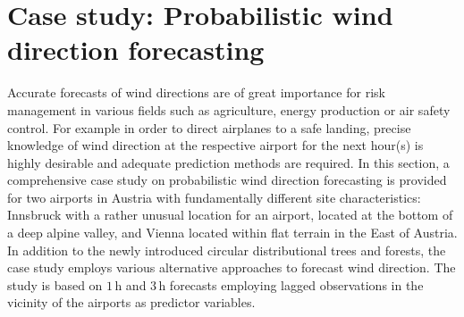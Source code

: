 \documentclass[nojss]{jss}
\numberwithin{equation}{section}
\begin{document}
\section{Case study: Probabilistic wind direction forecasting}
\label{sec:wind}
Accurate forecasts of wind directions are of great importance for risk
management in various fields such as agriculture, energy production or air safety control. 
For example in order to direct airplanes to a safe landing, precise knowledge of wind 
direction at the respective airport for the next hour(s) is highly desirable and adequate 
prediction methods are required. In this section, a comprehensive case study on probabilistic
wind direction forecasting is provided for two airports in Austria with fundamentally
different site characteristics: Innsbruck with a rather unusual location for an
airport, located at the bottom of a deep alpine valley, and Vienna located
within flat terrain in the East of Austria. In addition to the newly
introduced circular distributional trees and forests, the case study employs various
alternative approaches to forecast wind direction. The study is based on
$1$\,h and $3$\,h forecasts employing lagged observations in the vicinity of
the airports as predictor variables. 

\end{document}
